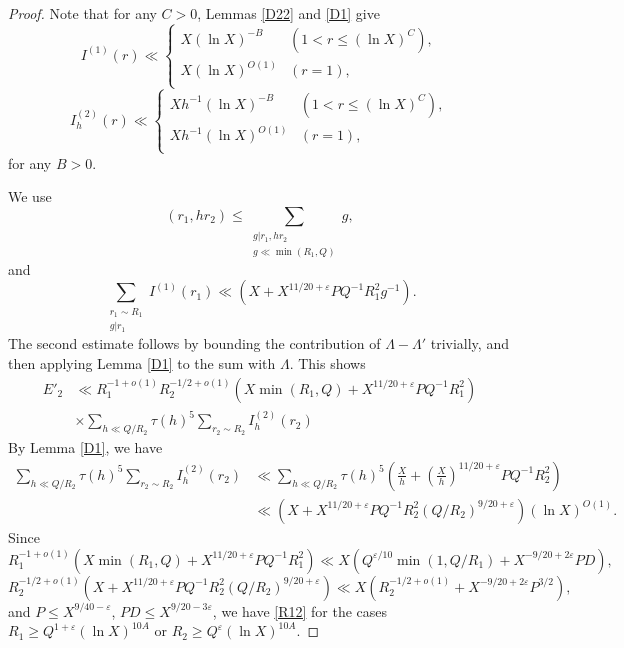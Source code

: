 \documentclass{amsart}
\theoremstyle{definition}
\theoremstyle{remark}
\newcommand{\1}{
    \bm{1}
}
\begin{document}
\begin{proof}
Note that for any $C>0$, Lemmas \ref{D22} and \ref{D1} give
\begin{equation} \label{I1log} I^{(1)}(r) \ll 
\begin{cases}
X (\ln{X})^{-B} & (1<r \leq (\ln{X})^{C}), \\
X (\ln{X})^{O(1)} & (r=1), \\
\end{cases}
\end{equation}
\begin{equation} \label{I2log} I^{(2)}_h(r) \ll 
\begin{cases}
Xh^{-1} (\ln{X})^{-B} & (1<r \leq (\ln{X})^{C}), \\
Xh^{-1} (\ln{X})^{O(1)} & (r=1), \\
\end{cases}
\end{equation}
for any $B>0$. 



We use 
\[ (r_1,h r_2) \leq \sum_{\substack{g|r_1,h r_2 \\ g \ll \min(R_1,Q)}} g, \]
and
\[ \sum_{\substack{r_1 \sim R_1 \\ g|r_1}} I^{(1)}(r_1) \ll \left( X+ X^{11/20+\varepsilon} PQ^{-1} R^2_1 g^{-1} \right). \]
The second estimate follows by bounding the contribution of $\Lambda-\Lambda'$ trivially, and then applying Lemma \ref{D1} to the sum with $\Lambda$. 
This shows 
\begin{align*}
E'_2 &\ll R^{-1+o(1)}_1 R^{-1/2+o(1)}_2 (X\min(R_1,Q)+X^{11/20+\varepsilon} PQ^{-1} R^2_1) \\
&\times \sum_{h \ll Q/R_2} \tau(h)^5 \sum_{r_2 \sim R_2} I^{(2)}_h(r_2) 
\end{align*}
By Lemma \ref{D1}, we have
\begin{align*}
\sum_{h \ll Q/R_2} \tau(h)^5 \sum_{r_2 \sim R_2} I^{(2)}_h(r_2) &\ll \sum_{h \ll Q/R_2} \tau(h)^5 \left( \frac{X}{h}+\left(\frac{X}{h}\right)^{11/20+\varepsilon} PQ^{-1} R^2_2 \right)  \\
&\ll \left( X+X^{11/20+\varepsilon} PQ^{-1} R^2_2 (Q/R_2)^{9/20+\varepsilon} \right) (\ln{X})^{O(1)}. 
\end{align*}
Since
\[ R^{-1+o(1)}_1 (X\min(R_1,Q)+X^{11/20+\varepsilon} PQ^{-1} R^2_1) \ll X(Q^{\varepsilon/10} \min(1,Q/R_1) + X^{-9/20+2\varepsilon} PD), \]
\[ R^{-1/2+o(1)}_2 \left( X+X^{11/20+\varepsilon} PQ^{-1} R^2_2 (Q/R_2)^{9/20+\varepsilon} \right) \ll X (R^{-1/2+o(1)}_2 + X^{-9/20+2\varepsilon} P^{3/2}), \]
and $P \leq X^{9/40-\varepsilon}$, $PD \leq X^{9/20-3\varepsilon}$, we have \eqref{R12} for the cases $R_1 \geq Q^{1+\varepsilon} (\ln{X})^{10A}$ or $R_2 \geq Q^{\varepsilon} (\ln{X})^{10A}$. 








\end{proof}
\end{document}
